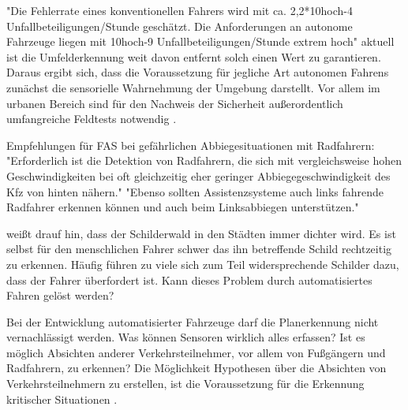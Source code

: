 "Die Fehlerrate eines konventionellen Fahrers wird mit ca. 2,2*10hoch-4 Unfallbeteiligungen/Stunde geschätzt. Die Anforderungen an autonome Fahrzeuge liegen mit 10hoch-9 Unfallbeteiligungen/Stunde extrem hoch" aktuell ist die Umfelderkennung weit davon entfernt solch einen Wert zu garantieren. Daraus ergibt sich, dass die Voraussetzung für jegliche Art autonomen Fahrens zunächst die sensorielle Wahrnehmung der Umgebung darstellt. Vor allem im urbanen Bereich sind für den Nachweis der Sicherheit außerordentlich umfangreiche Feldtests notwendig \parencite[S.246-249]{Klingner.2017}.

Empfehlungen für FAS bei gefährlichen Abbiegesituationen mit Radfahrern:
"Erforderlich ist die Detektion von Radfahrern, die sich mit vergleichsweise hohen Geschwindigkeiten bei oft gleichzeitig eher geringer Abbiegegeschwindigkeit des Kfz von hinten nähern."
"Ebenso sollten Assistenzsysteme auch links fahrende Radfahrer erkennen können und auch beim Linksabbiegen unterstützen." \parencite[S.310]{Schreiber.2014b}

\Textcite[S.55]{Bremer.2004} weißt drauf hin, dass der Schilderwald in den Städten immer dichter wird. Es ist selbst für den menschlichen Fahrer schwer das ihn betreffende Schild rechtzeitig zu erkennen. Häufig führen zu viele sich zum Teil widersprechende Schilder dazu, dass der Fahrer überfordert ist. Kann dieses Problem durch automatisiertes Fahren gelöst werden?

Bei der Entwicklung automatisierter Fahrzeuge darf die Planerkennung nicht vernachlässigt werden. Was können Sensoren wirklich alles erfassen? Ist es möglich Absichten anderer Verkehrsteilnehmer, vor allem von Fußgängern und Radfahrern, zu erkennen? Die Möglichkeit Hypothesen über die Absichten von Verkehrsteilnehmern zu erstellen, ist die Voraussetzung für die Erkennung kritischer Situationen \parencite[S.30]{MockHecker.1994}. %

